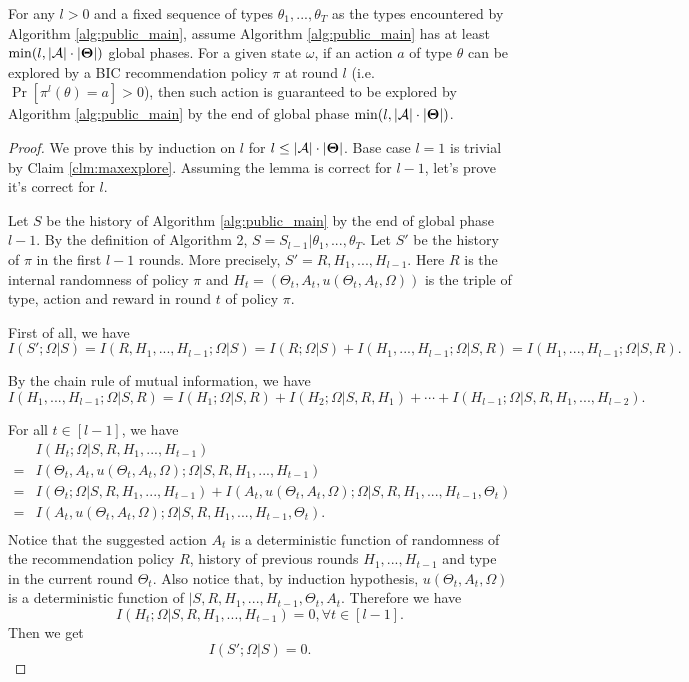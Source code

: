 \begin{lemma}
\label{lem:exp_public}
For any $l>0$ and a fixed sequence of types $\theta_1,...,\theta_T$ as the types encountered by Algorithm \ref{alg:public_main}, assume Algorithm \ref{alg:public_main} has at least $\min(l, |\mathcal{A}|\cdot |\bold{\Theta}|)$ global phases.
For a given state $\omega$, if an action $a$ of type $\theta$ can be explored by a BIC recommendation policy $\pi$ at round $l$ (i.e. $ \Pr[\pi^l(\theta)= a]> 0$), then such action is guaranteed to be explored by Algorithm \ref{alg:public_main} by the end of global phase $\min(l, |\mathcal{A}|\cdot |\bold{\Theta}|)$.
\end{lemma}

\begin{proof}
We prove this by induction on $l$ for $l \leq |\mathcal{A}|\cdot |\bold{\Theta}|$. Base case $l=1$ is trivial by Claim \ref{clm:maxexplore}. Assuming the lemma is correct for $l-1$, let's prove it's correct for $l$.

Let $S$ be the history of Algorithm \ref{alg:public_main} by the end of global phase $l-1$. By the definition of Algorithm 2, $S = S_{l-1} | \theta_1,...,\theta_T$.  Let $S'$ be the history of $\pi$ in the first $l-1$ rounds. More precisely, $S' = R, H_1,...,H_{l-1}$. Here $R$ is the internal randomness of policy $\pi$ and $H_t = (\Theta_t, A_t, u(\Theta_t, A_t, \Omega))$ is the triple of type, action and reward in round $t$ of policy $\pi$.

First of all, we have
\[
I(S'; \Omega| S) = I(R,H_1,...,H_{l-1}; \Omega| S)  = I(R; \Omega| S) + I(H_1,...,H_{l-1}; \Omega|S, R) = I(H_1,...,H_{l-1}; \Omega|S, R).
\]

By the chain rule of mutual information, we have
\[
 I(H_1,...,H_{l-1}; \Omega|S, R) = I(H_1;\Omega|S,R) + I(H_2;\Omega|S, R ,H_1) + \cdots + I(H_{l-1}; \Omega|S,R,H_1,...,H_{l-2}).
\]

For all $t \in [l-1]$, we have
\begin{align*}
&I(H_t; \Omega|S,R,H_1,...,H_{t-1}) \\
=& I(\Theta_t, A_t, u(\Theta_t, A_t, \Omega); \Omega|S,R,H_1,...,H_{t-1}) \\
=& I(\Theta_t ; \Omega|S,R,H_1,...,H_{t-1}) +  I(A_t, u(\Theta_t, A_t, \Omega); \Omega|S,R,H_1,...,H_{t-1},\Theta_t) \\
=& I(A_t, u(\Theta_t, A_t, \Omega); \Omega|S,R,H_1,...,H_{t-1},\Theta_t). \\
\end{align*}
Notice that the suggested action $A_t$ is a deterministic function of randomness of the recommendation policy $R$,  history of previous rounds $H_1,...,H_{t-1}$ and type in the current round $\Theta_t$. Also notice that, by induction hypothesis, $u(\Theta_t, A_t, \Omega)$ is a deterministic function of $|S,R,H_1,...,H_{t-1},\Theta_t, A_t$. Therefore we have
\[
I(H_t; \Omega|S,R,H_1,...,H_{t-1}) = 0, \forall t \in [l-1].
\]
Then we get
\[
I(S'; \Omega | S) = 0.
\]


\end{proof}
